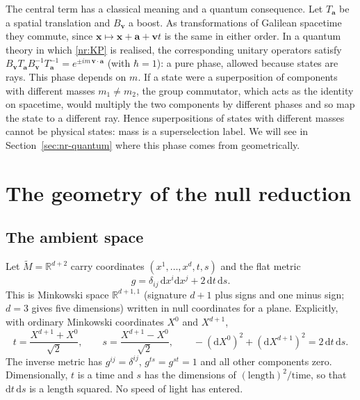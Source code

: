 The central term has a classical meaning and a quantum consequence. Let
$T_{\mathbf a}$ be a spatial translation and $B_{\mathbf v}$ a boost. As
transformations of Galilean spacetime they commute, since
$\mathbf{x}\mapsto\mathbf{x}+\mathbf{a}+\mathbf{v}t$ is the same in either
order. In a quantum theory in which \eqref{nr:KP} is realised, the
corresponding unitary operators satisfy
$B_{\mathbf v}T_{\mathbf a}B_{\mathbf v}^{-1}T_{\mathbf a}^{-1}=e^{\pm i m\,\mathbf{v}\cdot\mathbf{a}}$
(with $\hbar=1$): a pure phase, allowed because states are rays. This phase
depends on $m$. If a state were a superposition of components with different
masses $m_1\ne m_2$, the group commutator, which acts as the identity on
spacetime, would multiply the two components by different phases and so map
the state to a different ray. Hence superpositions of states with different
masses cannot be physical states: mass is a superselection label. We will see
in Section~\ref{sec:nr-quantum} where this phase comes from geometrically.

\section{The geometry of the null reduction}
\label{sec:nr-geometry}

\subsection{The ambient space}

Let $\tilde M=\mathbb{R}^{d+2}$ carry coordinates $(x^1,\dots,x^d,t,s)$ and the
flat metric
\begin{equation}
  g=\delta_{ij}\,\mathrm{d}x^i\mathrm{d}x^j+2\,\mathrm{d}t\,\mathrm{d}s .
  \label{nr:metric}
\end{equation}
This is Minkowski space $\mathbb{R}^{d+1,1}$ (signature $d+1$ plus signs and
one minus sign; $d=3$ gives five dimensions) written in null coordinates for a
plane. Explicitly, with ordinary Minkowski coordinates $X^0$ and $X^{d+1}$,
\begin{equation}
  t=\frac{X^{d+1}+X^0}{\sqrt2},\qquad s=\frac{X^{d+1}-X^0}{\sqrt2},\qquad
  -(\mathrm{d}X^0)^2+(\mathrm{d}X^{d+1})^2=2\,\mathrm{d}t\,\mathrm{d}s .
  \label{nr:nullcoords}
\end{equation}
The inverse metric has $g^{ij}=\delta^{ij}$, $g^{ts}=g^{st}=1$ and all other
components zero. Dimensionally, $t$ is a time and $s$ has the dimensions
of $(\text{length})^2/\text{time}$, so that $\mathrm{d}t\,\mathrm{d}s$ is a
length squared. No speed of light has entered.


